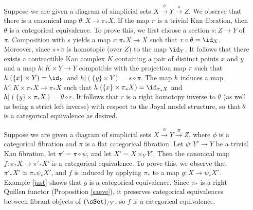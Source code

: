\begin{example}\label{just}
Suppose we are given a diagram of simplicial sets $X \stackrel{\phi}{\rightarrow} Y \stackrel{\pi}{\rightarrow} Z$.
We observe that there is a canonical map $\theta: X \rightarrow \pi_{\ast} X$. If the map $\pi$ is
a trivial Kan fibration, then $\theta$ is a categorical equivalence. To prove this, we first choose
a section $s: Z \rightarrow Y$ of $\pi$. Composition with $s$ yields a map
$r: \pi_{\ast} X \rightarrow X$ such that $r \circ \theta = \id_{X}$. Moreover, since
$s \circ \pi$ is homotopic (over $Z$) to the map $\id_{Y}$. It follows that there exists a contractible
Kan complex $K$ containing a pair of distinct points $x$ and $y$ and a map
$h: K \times Y \rightarrow Y$ compatible with the projection map $\pi$ such that
$h|( \{x\} \times Y) = \id_{Y}$ and $h | (\{y\} \times Y) = s \circ \pi$. The map
$h$ induces a map $h': K \times \pi_{\ast} X \rightarrow \pi_{\ast} X$ such
that $h|( \{x\} \times \pi_{\ast} X) = \id_{ \pi_{\ast} X}$ and $h|( \{y\} \times \pi_{\ast} X) = \theta \circ r$.
It follows that $r$ is a right homotopy inverse to $\theta$ (as well as being a strict left inverse) with respect to the Joyal model structure, so that $\theta$ is a categorical equivalence as desired.
\end{example}

\begin{remark}\label{safi}
Suppose we are given a diagram of simplicial sets
$X \stackrel{\phi}{\rightarrow} Y \stackrel{\pi}{\rightarrow} Z$, where
$\phi$ is a categorical fibration and $\pi$ is a flat categorical fibration.
Let $\psi: Y' \rightarrow Y$ be a trivial Kan fibration, let $\pi' = \pi \circ \psi$, and
let $X' = X \times_{Y} Y'$. Then the canonical map $f: \pi_{\ast} X \rightarrow \pi'_{\ast} X'$
is a categorical equivalence. To prove this, we observe that $\pi'_{\ast} X'
\simeq \pi_{\ast} \psi_{\ast} X'$, and $f$ is induced by applying
$\pi_{\ast}$ to a map $g: X \rightarrow \psi_{\ast} X'$. 
Example \ref{just} shows that $g$ is a categorical equivalence. Since
$\pi_{\ast}$ is a right Quillen functor (Proposition \ref{saeve}), it preserves
categorical equivalences between fibrant objects of $(\sSet)_{/Y}$, so
$f$ is a categorical equivalence.
\end{remark}

